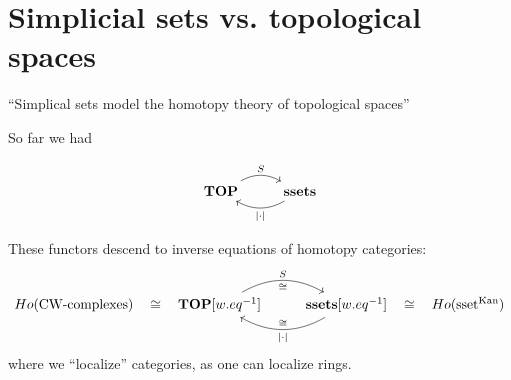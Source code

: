 \documentclass[language=english]{TemplateLecture}
\begin{document}

\section{Simplicial sets vs. topological spaces}

\enquote{Simplical sets model the homotopy theory of topological spaces}

So far we had

\[\begin{tikzcd}
    \mathbf{TOP} \ar[r, "S", bend left] & \mathbf{ssets} \ar[l, "\abs \cdot", bend left]
\end{tikzcd}\]

These functors descend to inverse equations of homotopy categories:
\[\begin{tikzcd}
    Ho(\text{CW-complexes}) \ar[r, phantom, "\cong"] & \mathbf{TOP}[w.eq^{-1}] \ar[r, bend left, "S", "\cong"'] & \mathbf{ssets}[w.eq^{-1}] \ar[l, "\abs\cdot", "\cong"', bend left] \ar[r, phantom, "\cong"] & Ho(\text{sset}^\text{Kan}) \\
\end{tikzcd}\]
where we \enquote{localize} categories, as one can localize rings.
\end{document}

